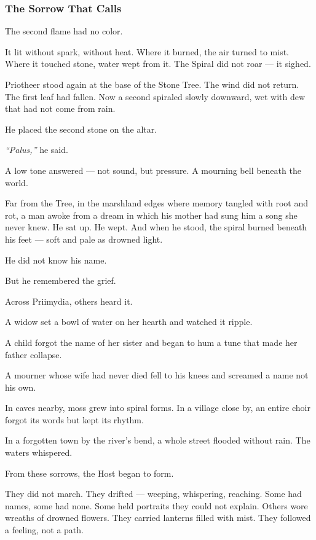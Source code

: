 \documentclass[12pt]{article}
\begin{document}
\vspace{.5in}

\subsubsection{The Sorrow That Calls}

The second flame had no color.

It lit without spark, without heat. Where it burned, the air turned to mist. Where it touched stone, water wept from it. The Spiral did not roar — it sighed.

Priotheer stood again at the base of the Stone Tree. The wind did not return. The first leaf had fallen. Now a second spiraled slowly downward, wet with dew that had not come from rain.

He placed the second stone on the altar.

\textit{``Palus,''} he said.

A low tone answered — not sound, but pressure. A mourning bell beneath the world.

Far from the Tree, in the marshland edges where memory tangled with root and rot, a man awoke from a dream in which his mother had sung him a song she never knew. He sat up. He wept. And when he stood, the spiral burned beneath his feet — soft and pale as drowned light.

He did not know his name.

But he remembered the grief.

Across Priimydia, others heard it.

A widow set a bowl of water on her hearth and watched it ripple.

A child forgot the name of her sister and began to hum a tune that made her father collapse.

A mourner whose wife had never died fell to his knees and screamed a name not his own.

In caves nearby, moss grew into spiral forms. In a village close by, an entire choir forgot its words but kept its rhythm.

In a forgotten town by the river’s bend, a whole street flooded without rain. The waters whispered.

From these sorrows, the Host began to form.

They did not march. They drifted — weeping, whispering, reaching. Some had names, some had none. Some held portraits they could not explain. Others wore wreaths of drowned flowers. They carried lanterns filled with mist. They followed a feeling, not a path.
\end{document}
